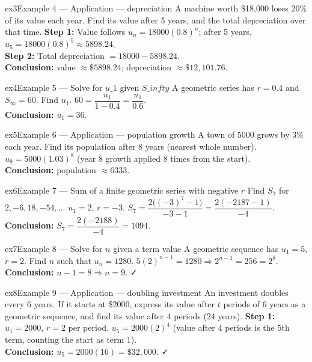 \documentclass[11pt]{article}
\begin{document}
\begin{example}{ex3}{Example 4 --- Application --- depreciation}
A machine worth \$18{,}000 loses 20\% of its value each year. Find its value after 5 years, and the total depreciation over that time.\soln
\textbf{Step 1:} Value follows $u_n=18000(0.8)^n$; after 5 years, $u_5=18000(0.8)^5\approx5898.24$.\\[3pt]
\textbf{Step 2:} Total depreciation $=18000-5898.24$.\\[3pt]
\textbf{Conclusion:} value $\approx\$5898.24$; depreciation $\approx\$12{,}101.76$.
\end{example}

\begin{example}{ex4}{Example 5 --- Solve for $u\_1$ given $S\_infty$}
A geometric series has $r=0.4$ and $S_\infty=60$. Find $u_1$.\soln
$60=\dfrac{u_1}{1-0.4}=\dfrac{u_1}{0.6}$.\\[3pt]\textbf{Conclusion:} $u_1=36$.
\end{example}

\begin{example}{ex5}{Example 6 --- Application --- population growth}
A town of 5000 grows by 3\% each year. Find its population after 8 years (nearest whole number).\soln
$u_9=5000(1.03)^8$ (year 8 growth applied 8 times from the start).\\[3pt]\textbf{Conclusion:} population $\approx6333$.
\end{example}

\begin{example}{ex6}{Example 7 --- Sum of a finite geometric series with negative $r$}
Find $S_7$ for $2,-6,18,-54,\dots$\soln
$u_1=2$, $r=-3$. $S_7=\dfrac{2\big((-3)^7-1\big)}{-3-1}=\dfrac{2(-2187-1)}{-4}$.\\[3pt]\textbf{Conclusion:} $S_7=\dfrac{2(-2188)}{-4}=1094$.
\end{example}

\begin{example}{ex7}{Example 8 --- Solve for $n$ given a term value}
A geometric sequence has $u_1=5$, $r=2$. Find $n$ such that $u_n=1280$.\soln
$5(2)^{n-1}=1280\Rightarrow2^{n-1}=256=2^8$.\\[3pt]\textbf{Conclusion:} $n-1=8\Rightarrow n=9$. ✓
\end{example}

\begin{example}{ex8}{Example 9 --- Application --- doubling investment}
An investment doubles every 6 years. If it starts at \$2000, express its value after $t$ periods of 6 years as a geometric sequence, and find its value after 4 periods (24 years).\soln
\textbf{Step 1:} $u_1=2000$, $r=2$ per period. $u_5=2000(2)^4$ (value after 4 periods is the 5th term, counting the start as term 1).\\[3pt]
\textbf{Conclusion:} $u_5=2000(16)=\$32{,}000$. ✓
\end{example}
\end{document}
